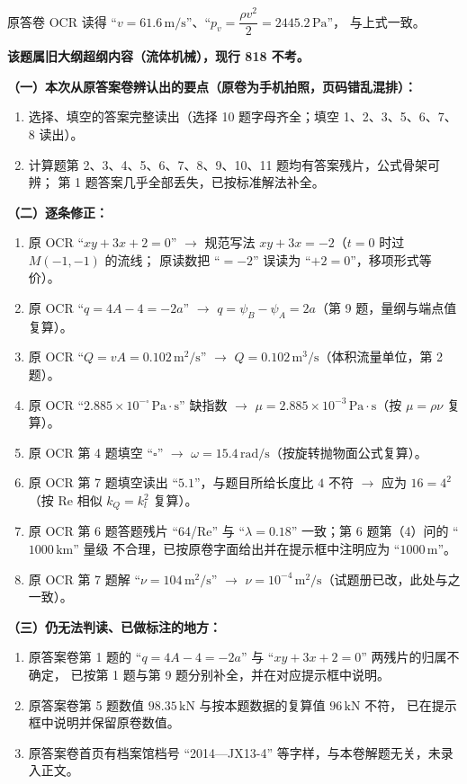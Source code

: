 \begin{tishi}
原答卷 OCR 读得 ``$v=61.6\,\mathrm{m/s}$''、``$p_v=\dfrac{\rho v^{2}}{2}=2445.2\,\mathrm{Pa}$''，
与上式一致。

\textbf{该题属旧大纲超纲内容（流体机械），现行 818 不考。}
\end{tishi}


\begin{tishi}
\textbf{（一）本次从原答案卷辨认出的要点（原卷为手机拍照，页码错乱混排）：}
\begin{enumerate}
  \item 选择、填空的答案完整读出（选择 10 题字母齐全；填空 1、2、3、5、6、7、8 读出）。
  \item 计算题第 2、3、4、5、6、7、8、9、10、11 题均有答案残片，公式骨架可辨；
    第 1 题答案几乎全部丢失，已按标准解法补全。
\end{enumerate}

\textbf{（二）逐条修正：}
\begin{enumerate}
  \item 原 OCR ``$xy+3x+2=0$'' $\to$ 规范写法 $xy+3x=-2$（$t=0$ 时过 $M(-1,-1)$ 的流线；
    原读数把 ``$=-2$'' 误读为 ``$+2=0$''，移项形式等价）。
  \item 原 OCR ``$q=4A-4=-2a$'' $\to$ $q=\psi_B-\psi_A=2a$（第 9 题，量纲与端点值复算）。
  \item 原 OCR ``$Q=vA=0.102\,\mathrm{m}^2/\mathrm{s}$'' $\to$ $Q=0.102\,\mathrm{m^{3}/s}$（体积流量单位，第 2 题）。
  \item 原 OCR ``$2.885\times10^{-\square}\,\mathrm{Pa\cdot s}$'' 缺指数 $\to$ $\mu=2.885\times10^{-3}\,\mathrm{Pa\cdot s}$（按 $\mu=\rho\nu$ 复算）。
  \item 原 OCR 第 4 题填空 ``$\square$'' $\to$ $\omega=15.4\,\mathrm{rad/s}$（按旋转抛物面公式复算）。
  \item 原 OCR 第 7 题填空读出 ``$5.1$''，与题目所给长度比 $4$ 不符 $\to$ 应为 $16=4^{2}$（按 Re 相似 $k_Q=k_l^{2}$ 复算）。
  \item 原 OCR 第 6 题答题残片 ``64/Re'' 与 ``$\lambda=0.18$'' 一致；第 6 题第（4）问的 ``$1000\,\mathrm{km}$'' 量级
    不合理，已按原卷字面给出并在提示框中注明应为 ``$1000\,\mathrm{m}$''。
  \item 原 OCR 第 7 题解 ``$\nu=104\,\mathrm{m^2/s}$'' $\to$ $\nu=10^{-4}\,\mathrm{m^2/s}$（试题册已改，此处与之一致）。
\end{enumerate}

\textbf{（三）仍无法判读、已做标注的地方：}
\begin{enumerate}
  \item 原答案卷第 1 题的 ``$q=4A-4=-2a$'' 与 ``$xy+3x+2=0$'' 两残片的归属不确定，
    已按第 1 题与第 9 题分别补全，并在对应提示框中说明。
  \item 原答案卷第 5 题数值 $98.35\,\mathrm{kN}$ 与按本题数据的复算值 $96\,\mathrm{kN}$ 不符，
    已在提示框中说明并保留原卷数值。
  \item 原答案卷首页有档案馆档号 ``2014---JX13-4'' 等字样，与本卷解题无关，未录入正文。
\end{enumerate}
\end{tishi}
